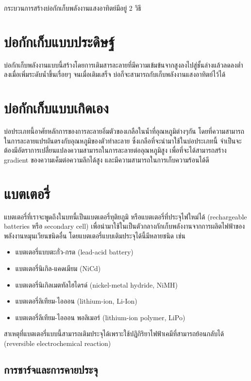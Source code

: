 \documentclass[a4paper,nobib,openany,10pt]{tufte-book}
\begin{document}
กระบวนการสร้างบ่อกักเก็บพลังงานแสงอาทิตย์มีอยู่ 2 วิธี

\section{บ่อกักเก็บแบบประดิษฐ์}
\label{sec:orgb95f0c3}
บ่อกักเก็บพลังงานแบบนี้สร้างโดยการเติมสารละลายที่มีความเข้มข้นจากสูงลงไปสู่ชั้นล่างแล้วลดลงต่ำลงเมื่อเพิ่มระดับน้ำขึ้นเรื่อยๆ
จนเมื่อเติมเสร็จ บ่อก็จะสามารถกับเก็บพลังงานแสงอาทิตย์ไว้ได้

\section{บ่อกักเก็บแบบเกิดเอง}
\label{sec:orgc154691}
บ่อประเภทนี้อาศัยหลักการของการละลายอิ่มตัวของเกลือในน้ำที่อุณหภูมิต่างๆกัน
โดยที่ความสามารถในการละลายแปรผันตรงกับอุณหภูมิของตัวทำละลาย
ซึ่งเกลือที่จะนำมาใช้ในบ่อประเภทนี้
จำเป็นจะต้องมีอัตราการเปลี่่ยนแปลงความสามารถในการละลายต่ออุณหภูมิสูง
เพื่อที่จะได้สามารถสร้าง gradient ของความเค็มต่อความลึกได้สูง
และมีความสามารถในการเก็บความร้อนได้ดี

\section{แบตเตอรี่}
\label{sec:org9e25ffe}

แบตเตอรี่ที่เราจะพูดถึงในบทนี้เป็นแบตเตอรี่ทุติยภูมิ หรือแบตเตอรี่ที่ประจุไฟใหม่ได้ (rechargeable batteries หรือ secondary cell) เพื่อนำมาใช้ในเป็นตัวกลางกักเก็บพลังงานจากการผลิตไฟฟ้าของพลังงานหมุนเวียนชนิดอื่น โดยแบตเตอรี่แบบเติมประจุได้นี้มีหลายชนิด เช่น

\begin{itemize}
\item แบตเตอรี่แบบตะกั่ว-กรด (lead-acid battery)
\item แบตเตอรี่นิเกิล-แคดเมียม (NiCd)
\item แบตเตอรี่นิเกิลเมตทัลไฮไดรด์ (nickel-metal hydride, NiMH)
\item แบตเตอรี่ลิเทียม-ไอออน (lithium-ion, Li-Ion)
\item แบตเตอรี่ลีเทียม-ไอออน พอลิเมอร์ (lithium-ion polymer, LiPo)
\end{itemize}

สาเหตุที่แบตเตอรี่แบบนี้สามารถเติมประจุได้เพราะใช้ปฏิกิริยาไฟฟ้าเคมีที่สามารถย้อนกลับได้ (reversible electrochemical reaction)

\subsection{การชาร์จและการคายประจุ}
\label{sec:org00bcea8}
\end{document}
